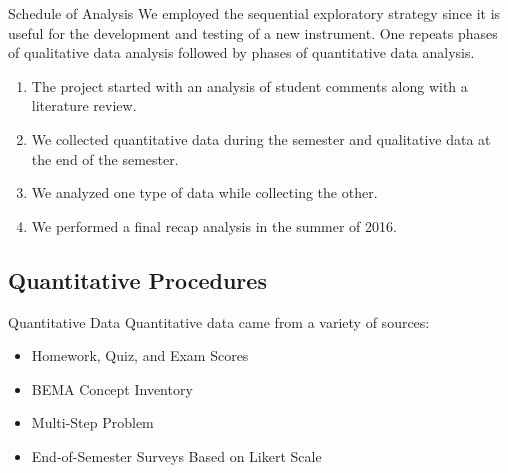 \documentclass[xcolor=x11names,compress]{beamer}
\begin{document}
\begin{frame}{Schedule of Analysis}
	We employed the sequential exploratory strategy since it is useful for the development and testing of a new instrument. One repeats phases of qualitative data analysis followed by phases of quantitative data analysis.
	\vspace{3mm}
	\begin{enumerate}
		\item The project started with an analysis of student comments along with a literature review.
		\item We collected quantitative data during the semester and qualitative data at the end of the semester.
		\item We analyzed one type of data while collecting the other.
		\item We performed a final recap analysis in the summer of 2016.
	\end{enumerate}
\end{frame}

\subsection{Quantitative Procedures}

\begin{frame}{Quantitative Data}
	Quantitative data came from a variety of sources:
	\begin{itemize}
		\item Homework, Quiz, and Exam Scores
		\item BEMA Concept Inventory
		\item Multi-Step Problem
		\item End-of-Semester Surveys Based on Likert Scale
	\end{itemize}
\end{frame}
\end{document}
